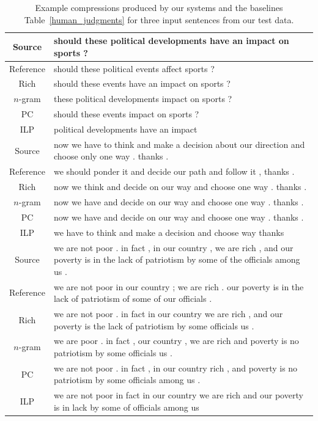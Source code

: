 \documentclass[11pt]{article}
\begin{document}
\begin{table}[!th]
\begin{center}
\small
{
\renewcommand{\arraystretch}{1.5}
\begin{tabular}{|c|>{\raggedright}m{13.2cm}|}
  \hline

  Source & should these political developments have an impact on sports
  ? \tabularnewline
  \hline
  Reference & should these political events affect sports ? \tabularnewline
  \hline
  Rich & should these events have an impact on sports ? \tabularnewline
  \hline
  $n$-gram & these political developments impact on sports ? \tabularnewline
  \hline
  PC & should these events impact on sports ? \tabularnewline
  \hline
  ILP & political developments have an impact \tabularnewline
  \hline
  \hline

  Source & now we have to think and make a decision about our direction
  and choose only one way . thanks . \tabularnewline
  \hline
  Reference & we should ponder it and decide our path and follow it , thanks
  . \tabularnewline
  \hline
  Rich & now we think and decide on our way and choose one way . thanks
  . \tabularnewline
  \hline
  $n$-gram & now we have and decide on our way and choose one way . thanks
  . \tabularnewline
  \hline
  PC & now we have and decide on our way and choose one way . thanks
  . \tabularnewline
  \hline
  ILP &  we have to think and make a decision and choose way thanks
  \tabularnewline
  \hline
  \hline

  Source &  we are not poor . in fact , in our country , we are rich , and
  our poverty is in the lack of patriotism by some of the officials
  among us . \tabularnewline
  \hline
  Reference &  we are not poor in our country ; we are rich . our poverty is
  in the lack of patriotism of some of our officials . \tabularnewline
  \hline
  Rich & we are not poor . in fact in our country we are rich , and our
  poverty is the lack of patriotism by some officials us
  . \tabularnewline
  \hline
  $n$-gram & we are poor . in fact , our country , we are rich and
  poverty is no patriotism by some officials us . \tabularnewline
  \hline
  PC & we are not poor . in fact , in our country rich , and poverty
  is no patriotism by some officials among us . \tabularnewline
  \hline
  ILP & we are not poor in fact in our country we are rich and our
  poverty is in lack by some of officials among us \tabularnewline
  \hline
\end{tabular}
}
\normalsize
\end{center}
\caption{Example compressions produced by our systems and the baselines
  Table~\ref{human_judgments} for three input sentences from our test
  data.}
\label{test_examples}
\end{table}
\end{document}
